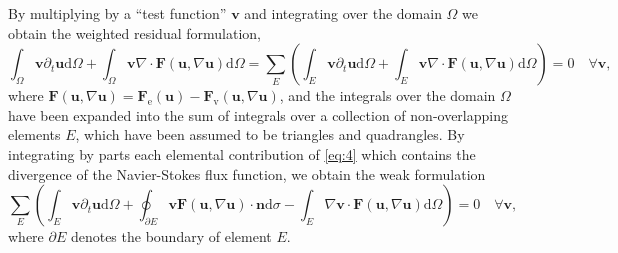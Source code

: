 \documentclass{develop-note}
\begin{document}
By multiplying by a ``test function'' $\mathbf{v}$ and integrating over the domain $\Omega$ we obtain the weighted residual formulation,
\begin{equation}
  \label{eq:4}
  \int_{\Omega}\mathbf{v}\partial_{t}\mathbf{u}\mathrm{d}\Omega+\int_{\Omega}\mathbf{v}\nabla\cdot\mathbf{F}(\mathbf{u},\nabla\mathbf{u})\mathrm{d}\Omega=\sum_{E}\left(\int_{E}\mathbf{v}\partial_{t}\mathbf{u}\mathrm{d}\Omega+\int_{E}\mathbf{v}\nabla\cdot\mathbf{F}(\mathbf{u},\nabla\mathbf{u})\mathrm{d}\Omega\right)=0\quad\forall\mathbf{v},
\end{equation}
where $\mathbf{F}(\mathbf{u},\nabla\mathbf{u})=\mathbf{F}_{\mathrm{e}}(\mathbf{u})-\mathbf{F}_{\mathrm{v}}(\mathbf{u},\nabla\mathbf{u})$, and the integrals over the domain $\Omega$ have been expanded into the sum of integrals over a collection of non-overlapping elements ${E}$, which have been assumed to be triangles and quadrangles. By integrating by parts each elemental contribution of \autoref{eq:4} which contains the divergence of the Navier-Stokes flux function, we obtain the weak formulation
\begin{equation}
  \label{eq:5}
  \sum_{E}\left(\int_{E}\mathbf{v}\partial_{t}\mathbf{u}\mathrm{d}\Omega+\oint_{\partial E}\mathbf{v}\mathbf{F}(\mathbf{u},\nabla\mathbf{u})\cdot\mathbf{n}\mathrm{d}\sigma-\int_{E}\nabla\mathbf{v}\cdot\mathbf{F}(\mathbf{u},\nabla\mathbf{u})\mathrm{d}\Omega\right)=0\quad\forall\mathbf{v},
\end{equation}
where $\partial E$ denotes the boundary of element $E$.
\end{document}

